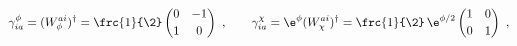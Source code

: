 \begin{equation}
  \gamma^\phi_{ia} = (W_\phi^{ai})^\dag = \frc{1}{\2} \begin{pmatrix}
  0 & -1 \\[2pt] 1 & 0 \end{pmatrix}\ ,\qquad \gamma^\chi_{ia} = \e^\phi
  (W_\chi^{ai})^\dag = \frc{1}{\2}\, \e^{\phi/2} \begin{pmatrix} 1 & 0
  \\[2pt] 0 & 1 \end{pmatrix}\ ,
 \end{equation}

